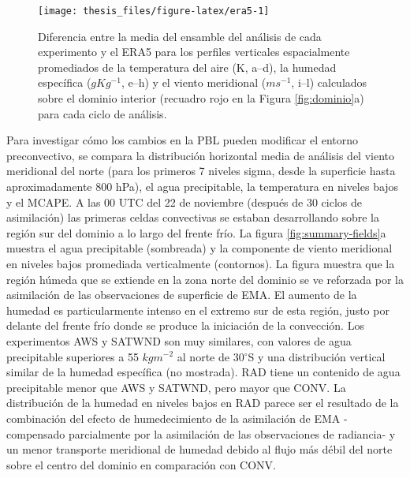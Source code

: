 \documentclass[12pt,oneside,a4paper]{reedthesis}
\begin{document}
\begin{figure}

\texttt{[image: thesis\_files/figure-latex/era5-1]} \hfill{}

\caption{Diferencia entre la media del ensamble del análisis de cada experimento y el ERA5 para los perfiles verticales espacialmente promediados de la temperatura del aire (K, a--d), la humedad específica (\(gKg^{-1}\), e--h) y el viento meridional (\(ms^{-1}\), i--l) calculados sobre el dominio interior (recuadro rojo en la Figura \ref{fig:dominio}a) para cada ciclo de análisis.}\label{fig:era5}
\end{figure}
Para investigar cómo los cambios en la PBL pueden modificar el entorno preconvectivo, se compara la distribución horizontal media de análisis del viento meridional del norte (para los primeros 7 niveles sigma, desde la superficie hasta aproximadamente 800 hPa), el agua precipitable, la temperatura en niveles bajos y el MCAPE. A las 00 UTC del 22 de noviembre (después de 30 ciclos de asimilación) las primeras celdas convectivas se estaban desarrollando sobre la región sur del dominio a lo largo del frente frío. La figura \ref{fig:summary-fields}a muestra el agua precipitable (sombreada) y la componente de viento meridional en niveles bajos promediada verticalmente (contornos). La figura muestra que la región húmeda que se extiende en la zona norte del dominio se ve reforzada por la asimilación de las observaciones de superficie de EMA. El aumento de la humedad es particularmente intenso en el extremo sur de esta región, justo por delante del frente frío donde se produce la iniciación de la convección. Los experimentos AWS y SATWND son muy similares, con valores de agua precipitable superiores a 55 \(kgm^{-2}\) al norte de 30\(^{\circ}\)S y una distribución vertical similar de la humedad específica (no mostrada). RAD tiene un contenido de agua precipitable menor que AWS y SATWND, pero mayor que CONV. La distribución de la humedad en niveles bajos en RAD parece ser el resultado de la combinación del efecto de humedecimiento de la asimilación de EMA -compensado parcialmente por la asimilación de las observaciones de radiancia- y un menor transporte meridional de humedad debido al flujo más débil del norte sobre el centro del dominio en comparación con CONV.
\end{document}
